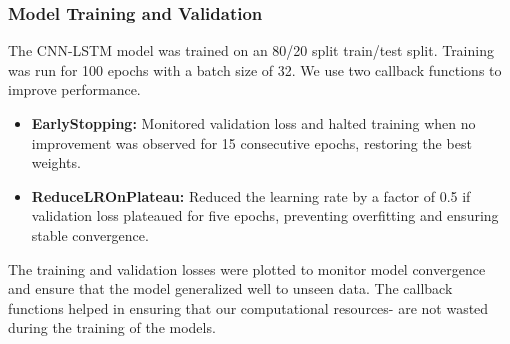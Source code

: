 \subsubsection{Model Training and Validation}
The CNN-LSTM model was trained on an 80/20 split train/test split. Training was run for 100 epochs with a batch size of 32. We use two callback functions to improve performance.
{\small
\begin{itemize}
	\item \textbf{EarlyStopping:} Monitored validation loss and halted training when no improvement was observed for 15 consecutive epochs, restoring the best weights.
	\item \textbf{ReduceLROnPlateau:} Reduced the learning rate by a factor of 0.5 if validation loss plateaued for five epochs, preventing overfitting and ensuring stable convergence.
\end{itemize}}
The training and validation losses were plotted to monitor model convergence and ensure that the model generalized well to unseen data. The callback functions helped in ensuring that our computational resources- are not wasted during the training of the models.
































